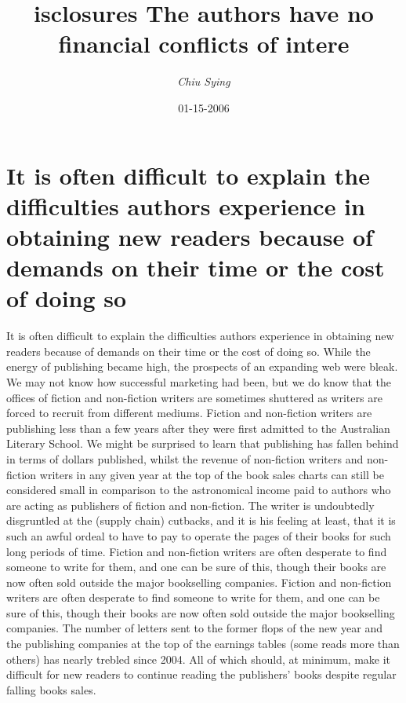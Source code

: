 \documentclass{article}%
\title{isclosures The authors have no financial conflicts of intere}%
\author{\textit{Chiu Sying}}%
\date{01-15-2006}%
\begin{document}
%
\normalsize%
\maketitle%
\section{It is often difficult to explain the difficulties authors experience in obtaining new readers because of demands on their time or the cost of doing so}%
\label{sec:Itisoftendifficulttoexplainthedifficultiesauthorsexperienceinobtainingnewreadersbecauseofdemandsontheirtimeorthecostofdoingso}%
It is often difficult to explain the difficulties authors experience in obtaining new readers because of demands on their time or the cost of doing so. While the energy of publishing became high, the prospects of an expanding web were bleak. We may not know how successful marketing had been, but we do know that the offices of fiction and non{-}fiction writers are sometimes shuttered as writers are forced to recruit from different mediums.\newline%
Fiction and non{-}fiction writers are publishing less than a few years after they were first admitted to the Australian Literary School. We might be surprised to learn that publishing has fallen behind in terms of dollars published, whilst the revenue of non{-}fiction writers and non{-}fiction writers in any given year at the top of the book sales charts can still be considered small in comparison to the astronomical income paid to authors who are acting as publishers of fiction and non{-}fiction.\newline%
The writer is undoubtedly disgruntled at the (supply chain) cutbacks, and it is his feeling at least, that it is such an awful ordeal to have to pay to operate the pages of their books for such long periods of time.\newline%
Fiction and non{-}fiction writers are often desperate to find someone to write for them, and one can be sure of this, though their books are now often sold outside the major bookselling companies.\newline%
Fiction and non{-}fiction writers are often desperate to find someone to write for them, and one can be sure of this, though their books are now often sold outside the major bookselling companies. The number of letters sent to the former flops of the new year and the publishing companies at the top of the earnings tables (some reads more than others) has nearly trebled since 2004. All of which should, at minimum, make it difficult for new readers to continue reading the publishers’ books despite regular falling books sales.\newline%
\end{document}
